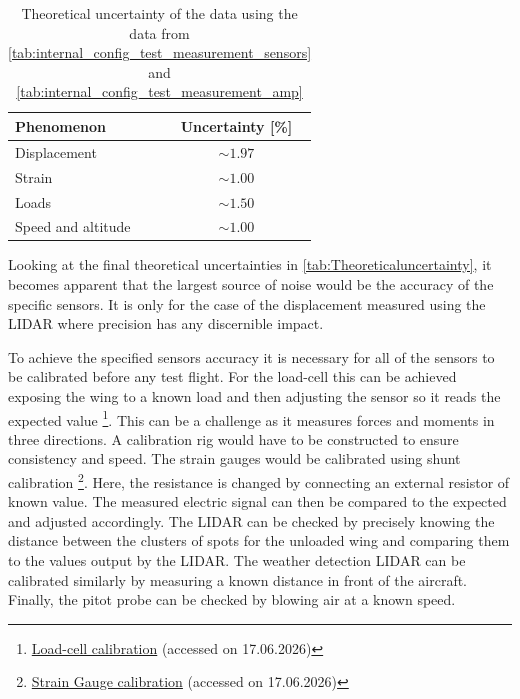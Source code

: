 \begin{table}[H]
    \centering
    \caption{Theoretical uncertainty of the data using the data from \autoref{tab:internal_config_test_measurement_sensors} and \autoref{tab:internal_config_test_measurement_amp}}
    \label{tab:Theoreticaluncertainty}
    \begin{tabular}{|p{3cm}|c|}
        \hline
        \textbf{Phenomenon} & \textbf{Uncertainty [\%]} \\
        \hline\hline
        Displacement  & $\sim1.97 $ \\\hline
        Strain        & $\sim1.00 $ \\\hline
        Loads         & $\sim1.50 $ \\\hline
        Speed and altitude & $\sim1.00 $ \\\hline
    \end{tabular}
\end{table}

Looking at the final theoretical uncertainties in \autoref{tab:Theoreticaluncertainty}, it becomes apparent that the largest source of noise would be the accuracy of the specific sensors. It is only for the case of the displacement measured using the LIDAR where precision has any discernible impact.

To achieve the specified sensors accuracy it is necessary for all of the sensors to be calibrated before any test flight. For the load-cell this can be achieved exposing the wing to a known load and then adjusting the sensor so it reads the expected value \footnote{\href{https://www.ittc.info/media/9815/76-02-09.pdf}{Load-cell calibration} (accessed on 17.06.2026)}. This can be a challenge as it measures forces and moments in three directions. A calibration rig would have to be constructed to ensure consistency and speed. The strain gauges would be calibrated using shunt calibration  \footnote{\href{https://web.enib.fr/~bourgeot/IPS/Datasheets/AN078-Strain_Gauge_Measurement-A_Tutorial.pdf}{Strain Gauge calibration} (accessed on 17.06.2026)}. Here, the resistance is changed by connecting an external resistor of known value. The measured electric signal can then be compared to the expected and adjusted accordingly. The LIDAR can be checked by precisely knowing the distance between the clusters of spots for the unloaded wing and comparing them to the values output by the LIDAR. The weather detection LIDAR can be calibrated similarly by measuring a known distance in front of the aircraft. Finally, the pitot probe can be checked by blowing air at a known speed. 

